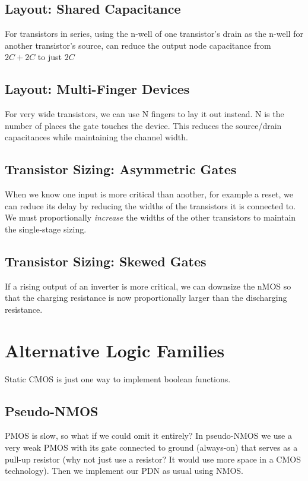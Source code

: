 \documentclass[11pt]{report}
\begin{document}
\subsection{Layout: Shared Capacitance}
For transistors in series, using the n-well of one transistor's drain as the n-well for another transistor's source, can reduce the output node capacitance from $2C + 2C$ to just $2C$

\subsection{Layout: Multi-Finger Devices}
For very wide transistors, we can use N fingers to lay it out instead. N is the number of places the gate touches the device. This reduces the source/drain capacitances while maintaining the channel width.

\subsection{Transistor Sizing: Asymmetric Gates}
When we know one input is more critical than another, for example a reset, we can reduce its delay by reducing the widths of the transistors it is connected to. We must proportionally \textit{increase} the widths of the other transistors to maintain the single-stage sizing.

\subsection{Transistor Sizing: Skewed Gates}
If a rising output of an inverter is more critical, we can downsize the nMOS so that the charging resistance is now proportionally larger than the discharging resistance.


\section{Alternative Logic Families}
Static CMOS is just one way to implement boolean functions.

\subsection{Pseudo-NMOS}
PMOS is slow, so what if we could omit it entirely? In pseudo-NMOS we use a very weak PMOS with its gate connected to ground (always-on) that serves as a pull-up resistor (why not just use a resistor? It would use more space in a CMOS technology). Then we implement our PDN as usual using NMOS.
\end{document}
